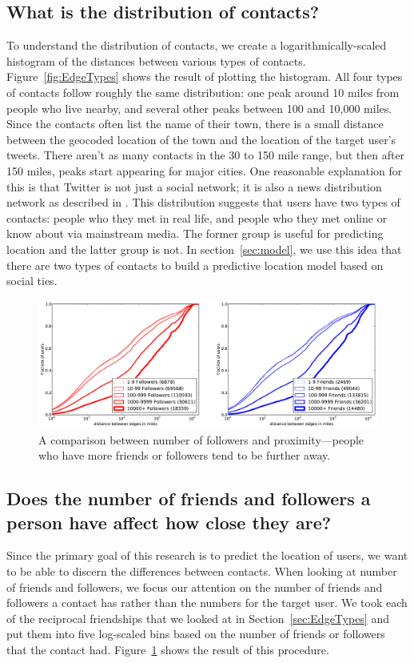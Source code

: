 \documentclass[letterpaper]{article}
\newcommand{\flsec}[1]{\subsection{#1}}
\begin{document}
\flsec{What is the distribution of contacts?}

To understand the distribution of contacts, we create a logarithmically-scaled
histogram of the distances between various types of contacts.
%
Figure~\ref{fig:EdgeTypes} shows the result of plotting the histogram.
%
All four types of contacts follow roughly the same
distribution: one peak around 10 miles from people who live nearby, and several
other peaks between 100 and 10,000 miles.
%
Since the contacts often list the name of their town, there is a small distance
between the geocoded location of the town and the location of the target
user's tweets.
%
There aren't as many contacts in the 30 to 150 mile range, but then after 150
miles, peaks start appearing for major cities.
%
One reasonable explanation for this is that Twitter is not just a social
network; it is also a news distribution network as described in
\cite{kwak2010why}.
%
This distribution suggests that users have two types of contacts: people who
they met in real life, and people who they met online or know about via
mainstream media.
%
The former group is useful for predicting location and the latter group is not.
%
In section~\ref{sec:model}, we use this idea that there are two types of
contacts to build a predictive location model based on social ties.


\begin{figure}[tbh]
\centering
\includegraphics[width=\linewidth]{figures/edge_counts.pdf}
\caption{
A comparison between number of followers and proximity---people who have more
friends or followers tend to be further away.
}
\label{fig:EdgeCounts}
\end{figure}

\flsec{Does the number of friends and followers a person have affect how
close they are?}

Since the primary goal of this research is to predict the location of users, we
want to be able to discern the differences between contacts.
%
When looking at number of friends and followers, we focus our attention on the
number of friends and followers a contact has rather than the numbers for the
target user.
%
We took each of the reciprocal friendships that we looked at in
Section~\ref{sec:EdgeTypes} and put them into five log-scaled bins based on
the number of friends or followers that the contact had.
%
Figure~\ref{fig:EdgeCounts} shows the result of this procedure.
\end{document}
